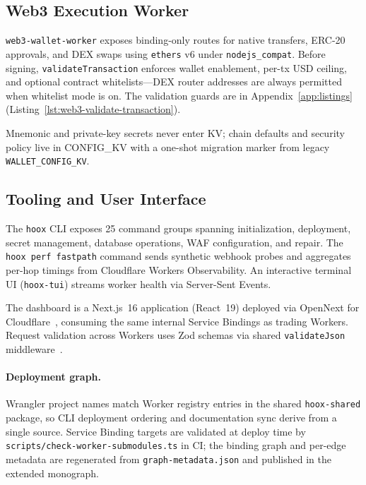 \subsection{Web3 Execution Worker}

\texttt{web3-wallet-worker} exposes binding-only routes for native transfers, ERC-20 approvals, and DEX swaps using \texttt{ethers} v6 under \texttt{nodejs\_compat}. Before signing, \texttt{validateTransaction} enforces wallet enablement, per-tx USD ceiling, and optional contract whitelists---DEX router addresses are always permitted when whitelist mode is on. The validation guards are in Appendix~\ref{app:listings} (Listing~\ref{lst:web3-validate-transaction}).

Mnemonic and private-key secrets never enter KV; chain defaults and security policy live in CONFIG\_KV with a one-shot migration marker from legacy \texttt{WALLET\_CONFIG\_KV}.

\subsection{Tooling and User Interface}

The \texttt{hoox} CLI exposes 25 command groups spanning initialization, deployment, secret management, database operations, WAF configuration, and repair. The \texttt{hoox perf fastpath} command sends synthetic webhook probes and aggregates per-hop timings from Cloudflare Workers Observability. An interactive terminal UI (\texttt{hoox-tui}) streams worker health via Server-Sent Events.

The dashboard is a Next.js~16 application (React~19) deployed via OpenNext for Cloudflare~\cite{opennext-cloudflare}, consuming the same internal Service Bindings as trading Workers. Request validation across Workers uses Zod schemas via shared \texttt{validateJson} middleware~\cite{zod}.

\paragraph{Deployment graph.} Wrangler project names match Worker registry entries in the shared \texttt{hoox-shared} package, so CLI deployment ordering and documentation sync derive from a single source. Service Binding targets are validated at deploy time by \texttt{scripts/check-worker-submodules.ts} in CI; the binding graph and per-edge metadata are regenerated from \texttt{graph-metadata.json} and published in the extended monograph.
